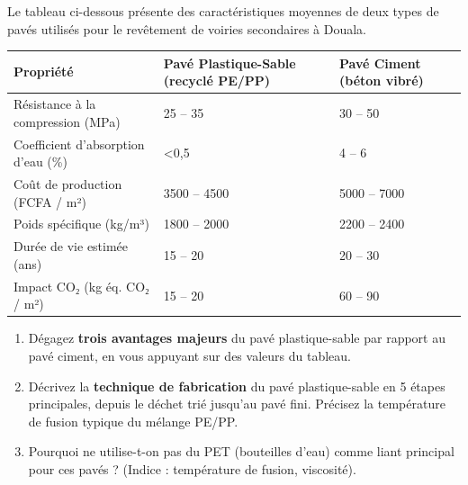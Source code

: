 \documentclass[11pt]{article}
\begin{document}
\begin{exercice}
Le tableau ci-dessous présente des caractéristiques moyennes de deux types de pavés utilisés pour le revêtement de voiries secondaires à Douala.
\begin{center}
\begin{tabularx}{\linewidth}{|l|X|X|}\hline
\textbf{Propriété} & \textbf{Pavé Plastique-Sable (recyclé PE/PP)} & \textbf{Pavé Ciment (béton vibré)} \\ \hline
Résistance à la compression (MPa) & 25 -- 35 & 30 -- 50 \\ \hline
Coefficient d'absorption d'eau (\%) & \textless 0,5 & 4 -- 6 \\ \hline
Coût de production (FCFA / m²) & \num{3500} -- \num{4500} & \num{5000} -- \num{7000} \\ \hline
Poids spécifique (kg/m³) & \num{1800} -- \num{2000} & \num{2200} -- \num{2400} \\ \hline
Durée de vie estimée (ans) & 15 -- 20 & 20 -- 30 \\ \hline
Impact CO₂ (kg éq. CO₂ / m²) & \num{15} -- \num{20} & \num{60} -- \num{90} \\ \hline
\end{tabularx}
\end{center}
\begin{enumerate}
    \item Dégagez \textbf{trois avantages majeurs} du pavé plastique-sable par rapport au pavé ciment, en vous appuyant sur des valeurs du tableau.
    \item Décrivez la \textbf{technique de fabrication} du pavé plastique-sable en 5 étapes principales, depuis le déchet trié jusqu'au pavé fini. Précisez la température de fusion typique du mélange PE/PP.
    \item Pourquoi ne utilise-t-on pas du PET (bouteilles d'eau) comme liant principal pour ces pavés ? (Indice : température de fusion, viscosité).
\end{enumerate}
\end{exercice}
\end{document}

